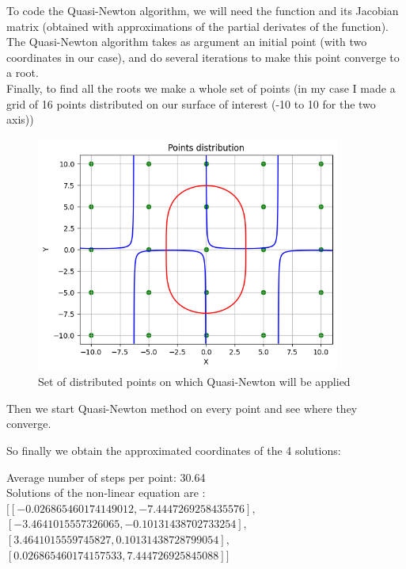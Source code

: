 To code the Quasi-Newton algorithm, we will need the function and its Jacobian matrix (obtained with approximations of the partial derivates of the function).\\

The Quasi-Newton algorithm takes as argument an initial point (with two coordinates in our case), and do several iterations to make this point converge to a root.\\

Finally, to find all the roots we make a whole set of points (in my case I made a grid of 16 points distributed on our surface of interest (-10 to 10 for the two axis))\\

\begin{figure}[H]
    \centering
    \includegraphics[width=10cm]{images/nldistribution.png}
    \caption{Set of distributed points on which Quasi-Newton will be applied}
    \label{fig:nldistri}
\end{figure}
Then we start Quasi-Newton method on every point and see where they converge.

So finally we obtain the approximated coordinates of the 4 solutions:\\
\begin{resultbox}
    Average number of steps per point: 30.64\\
    Solutions of the non-linear equation are : \\
    $[[-0.026865460174149012, -7.4447269258435576],$\\
    $[-3.4641015557326065, -0.10131438702733254],$\\
    $[3.4641015559745827, 0.10131438728799054],$\\
    $[0.026865460174157533, 7.444726925845088]]$
\end{resultbox}
